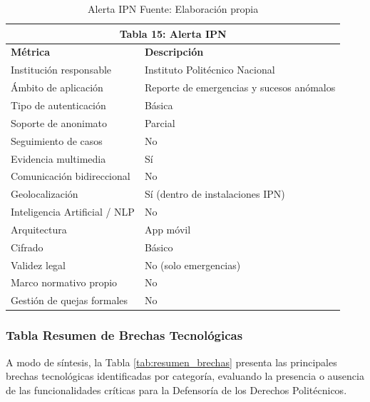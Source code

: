 \begin{table}[htbp]
\centering
\small
\begin{tabular}{|l|l|}
\hline \multicolumn{2}{|c|}{\textbf{Tabla 15: Alerta IPN}} \\
\hline \textbf{Métrica} & \textbf{Descripción} \\
\hline Institución responsable & Instituto Politécnico Nacional \\
\hline Ámbito de aplicación & Reporte de emergencias y sucesos anómalos \\
\hline Tipo de autenticación & Básica \\
\hline Soporte de anonimato & Parcial \\
\hline Seguimiento de casos & No \\
\hline Evidencia multimedia & Sí \\
\hline Comunicación bidireccional & No \\
\hline Geolocalización & Sí (dentro de instalaciones IPN) \\
\hline Inteligencia Artificial / NLP & No \\
\hline Arquitectura & App móvil \\
\hline Cifrado & Básico \\
\hline Validez legal & No (solo emergencias) \\
\hline Marco normativo propio & No \\
\hline Gestión de quejas formales & No \\
\hline \end{tabular}
\caption{Alerta IPN \label{tab:alertaIpn} \footnotesize Fuente: Elaboración propia \cite{23}} 
\end{table}



\subsubsection{Tabla Resumen de Brechas Tecnológicas}

\begin{flushleft}
\justifying
A modo de síntesis, la Tabla \ref{tab:resumen_brechas} presenta las principales brechas tecnológicas identificadas por categoría, evaluando la presencia o ausencia de las funcionalidades críticas para la Defensoría de los Derechos Politécnicos.
\end{flushleft}

